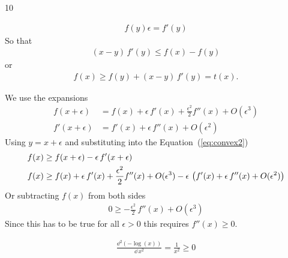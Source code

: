 \documentclass{sotonExamBoxes}    %
\begin{document}
\begin{question}{10}
\begin{qparts}
\begin{answer}
\begin{align*}
{          f(y)}{\epsilon}  = f'(y)
        \end{align*}
        So that
        \begin{align*}
           (x-y) \, f'(y) \leq f(x) - f(y)
        \end{align*}
        or
        \begin{align*}
          f(x) \geq f(y) + (x-y)\,f'(y) = t(x).
        \end{align*}
      \end{answer}
      \clearpage
      \begin{answer}
      \end{answer}
      \begin{answer}
        We use the expansions
        \begin{align*}
          f(x+\epsilon) &= f(x) + \epsilon\,f'(x) +
                          \frac{\epsilon^2}{2} f''(x) + O(\epsilon^3) \\
          f'(x+\epsilon) &= f'(x) + \epsilon\,f''(x) +
                           O(\epsilon^2) 
        \end{align*}
        Using $y=x+\epsilon$ and substituting into the Equation~(\ref{eq:convex2})
        \begin{align*}
          f(x) &\geq f(x+\epsilon)  - \epsilon \, f'(x+\epsilon) \\
          f(x) &\geq f(x) + \epsilon\,f'(x) +
          \frac{\epsilon^2}{2} f''(x) + O(\epsilon^3)
          - \epsilon\,\left( f'(x) + \epsilon\,f''(x) +
                           O(\epsilon^2)  \right)
        \end{align*}
        Or subtracting $f(x)$ from both sides
        \begin{align*}
          0 \geq - \frac{\epsilon^2}{2} \, f''(x) + O(\epsilon^3)
        \end{align*}
        Since this has to be true for all $\epsilon>0$ this requires $f''(x)\geq0$.
      \end{answer}
      \begin{answer}
        \begin{align*}
          \frac{\dd^2 (-\log(x))}{\dd \, x^2} = \frac{1}{x^2} \geq 0
        \end{align*}
      \end{answer}
  \end{qparts}
\end{question}
\clearpage
\end{document}
